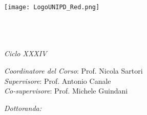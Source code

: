 \begin{titlepage}

    \begin{center}
        \texttt{[image: LogoUNIPD\_Red.png]}
    \end{center}

    \vfill

    \begin{center}
        \large
        
        \spacedlowsmallcaps{\myUni} \\
        \bigskip
        \myDepartment \\
        \bigskip
        \emph{\myFaculty}\\
        \medskip
        \emph{Ciclo XXXIV}
    \end{center}

    \vfill

    \begin{center}
        \color{UnipdRed}\Huge
        \spacedallcaps{\myTitle}
    \end{center}

    \medskip


    \vfill

        \begin{flushleft}
            \large
            \emph{Coordinatore del Corso}: Prof. Nicola Sartori \\
            \medskip
            \emph{Supervisore}: Prof. Antonio Canale \\
            \medskip
            \emph{Co-supervisore}: Prof. Michele Guindani
            \bigskip
        \end{flushleft}
        \begin{flushright}
            \large
            \emph{Dottoranda:}
            \myName
        \end{flushright}


    \vfill

    \begin{center}
        \large

        \myDate
    \end{center}


    \vfill

\end{titlepage}


